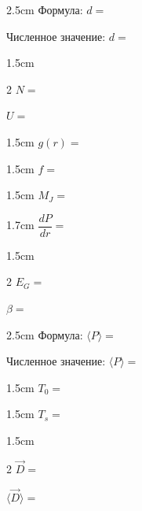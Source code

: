 
\begin{answerbox}{2.5cm}
Формула: \(d=\)

\bigskip

Численное значение: \(d=\)
\end{answerbox}

\begin{answerbox}{1.5cm}
\begin{multicols}{2}
\(N=\)

\columnbreak

\(U=\)
\end{multicols}
\end{answerbox}

\begin{answerbox}{1.5cm}
\(g(r)=\)
\end{answerbox}

\begin{answerbox}{1.5cm}
\(f=\)
\end{answerbox}

\begin{answerbox}{1.5cm}
\(M_J=\)
\end{answerbox}

\begin{answerbox}{1.7cm}
\(\dfrac{dP}{dr}=\)
\end{answerbox}

\begin{answerbox}{1.5cm}
\begin{multicols}{2}
\(E_G=\)

\columnbreak

\(\beta=\)
\end{multicols}
\end{answerbox}

\begin{answerbox}{2.5cm}
Формула: \(\langle P\rangle=\)

\bigskip

Численное значение: \(\langle P\rangle=\)
\end{answerbox}

\begin{answerbox}{1.5cm}
\(T_0=\)
\end{answerbox}

\begin{answerbox}{1.5cm}
\(T_s=\)
\end{answerbox}

\begin{answerbox}{1.5cm}
\begin{multicols}{2}
\(\vec D=\)

\columnbreak

\(\langle\vec D\rangle=\)
\end{multicols}
\end{answerbox}

